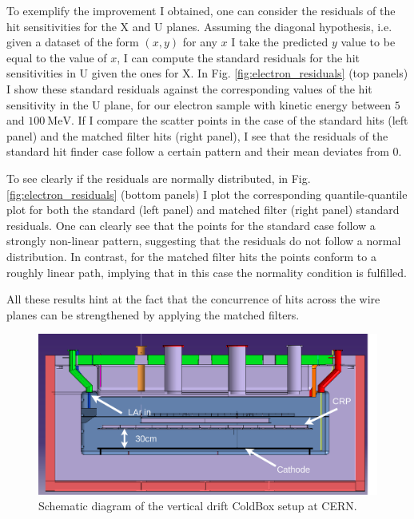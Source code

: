 To exemplify the improvement I obtained, one can consider the residuals of the hit sensitivities for the X and U planes. Assuming the diagonal hypothesis, i.e. given a dataset of the form $(x, y)$ for any $x$ I take the predicted $y$ value to be equal to the value of $x$, I can compute the standard residuals for the hit sensitivities in U given the ones for X. In Fig. \ref{fig:electron_residuals} (top panels) I show these standard residuals against the corresponding values of the hit sensitivity in the U plane, for our electron sample with kinetic energy between $5$ and $100 \ \mathrm{MeV}$. If I compare the scatter points in the case of the standard hits (left panel) and the matched filter hits (right panel), I see that the residuals of the standard hit finder case follow a certain pattern and their mean deviates from $0$.

To see clearly if the residuals are normally distributed, in Fig. \ref{fig:electron_residuals} (bottom panels) I plot the corresponding quantile-quantile plot for both the standard (left panel) and matched filter (right panel) standard residuals. One can clearly see that the points for the standard case follow a strongly non-linear pattern, suggesting that the residuals do not follow a normal distribution. In contrast, for the matched filter hits the points conform to a roughly linear path, implying that in this case the normality condition is fulfilled.

All these results hint at the fact that the concurrence of hits across the wire planes can be strengthened by applying the matched filters.

\begin{figure}[t]
    \centering
    \includegraphics[scale = 0.2]{Images/Matched_Filter/VD_Coldbox_Diagram.png}
    \caption{Schematic diagram of the vertical drift ColdBox setup at CERN.}
    \label{fig:vdcoldbox}
\end{figure}

